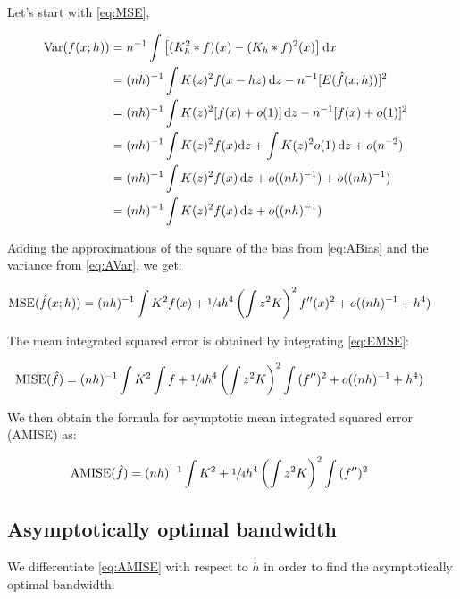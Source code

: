 Let's start with \autoref{eq:MSE},

\begin{align}
\mbox{Var}(f(x;h)) & = n^{-1} \int{\left[(\ensuremath{K_h^2 \ast f})(x) - (\ensuremath{K_h \ast f})^2(x)\right]\mathrm{d}x} && \nonumber \\
    & = (nh)^{-1} \int{K(z)^2f(x - hz)\,\mathrm{d}z} - n^{-1} [E(\hat{f}(x;h))]^2 && \nonumber \\
    & = (nh)^{-1} \int{K(z)^2[f(x) + o(1)]\,\mathrm{d}z} - n^{-1}[f(x) + o(1)]^2 && \nonumber \\
    & = (nh)^{-1} \int{K(z)^2f(x)\mathrm{d}z} + \int{K(z)^2o(1)\,\mathrm{d}z} + o(n^{-2})  && \nonumber \\
    & = (nh)^{-1} \int{K(z)^2f(x)\,\mathrm{d}z} + o((nh)^{-1}) + o((nh)^{-1}) && \nonumber \\
    & = (nh)^{-1} \int{K(z)^2f(x)\,\mathrm{d}z} + o((nh)^{-1}) && \label{eq:AVar}
\end{align}

Adding the approximations of the square of the bias from \autoref{eq:ABias} and the variance from \autoref{eq:AVar}, we get:

\begin{align}
\mbox{MSE}(\hat{f}(x;h)) & = (nh)^{-1} \int{K^2}f(x) + \sfrac{1}{4}h^4\left(\int{z^2K}\right)^2f^{\prime\prime}(x)^2 + o((nh)^{-1} + h^4) && \label{eq:EMSE}
\end{align}

The mean integrated squared error is obtained by integrating \autoref{eq:EMSE}:

\begin{align}
\mbox{MISE}(\hat{f}) & = (nh)^{-1} \int{K^2}\int{f} + \sfrac{1}{4}h^4\left(\int{z^2K}\right)^2 \int{ (f^{\prime\prime})^2 } + o((nh)^{-1} + h^4) && \label{eq:EMISE}
\end{align}

We then obtain the formula for asymptotic mean integrated squared error (AMISE) as:

\begin{align}
\mbox{AMISE}(\hat{f}) & = (nh)^{-1} \int{K^2} + \sfrac{1}{4}h^4\left(\int{z^2K}\right)^2 \int{ (f^{\prime\prime})^2 } && \label{eq:AMISE}
\end{align}

\subsection{Asymptotically optimal bandwidth}

We differentiate \autoref{eq:AMISE} with respect to $h$ in order to find the asymptotically optimal bandwidth.


